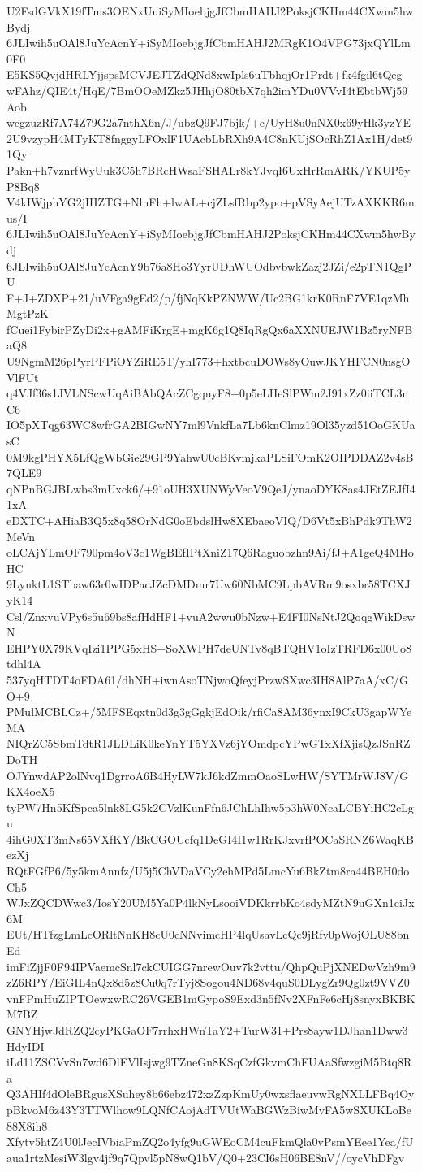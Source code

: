 U2FsdGVkX19fTms3OENxUuiSyMIoebjgJfCbmHAHJ2PoksjCKHm44CXwm5hwBydj
6JLIwih5uOAl8JuYcAcnY+iSyMIoebjgJfCbmHAHJ2MRgK1O4VPG73jxQYlLm0F0
E5KS5QvjdHRLYjjspsMCVJEJTZdQNd8xwIpls6uTbhqjOr1Prdt+fk4fgil6tQeg
wFAhz/QIE4t/HqE/7BmOOeMZkz5JHhjO80tbX7qh2imYDu0VVvI4tEbtbWj59Aob
wcgzuzRf7A74Z79G2a7nthX6n/J/ubzQ9FJ7bjk/+c/UyH8u0nNX0x69yHk3yzYE
2U9vzypH4MTyKT8fnggyLFOxlF1UAcbLbRXh9A4C8nKUjSOcRhZ1Ax1H/det91Qy
Pakn+h7vznrfWyUuk3C5h7BRcHWsaFSHALr8kYJvqI6UxHrRmARK/YKUP5yP8Bq8
V4kIWjphYG2jIHZTG+NlnFh+lwAL+cjZLsfRbp2ypo+pVSyAejUTzAXKKR6mus/I
6JLIwih5uOAl8JuYcAcnY+iSyMIoebjgJfCbmHAHJ2PoksjCKHm44CXwm5hwBydj
6JLIwih5uOAl8JuYcAcnY9b76a8Ho3YyrUDhWUOdbvbwkZazj2JZi/e2pTN1QgPU
F+J+ZDXP+21/uVFga9gEd2/p/fjNqKkPZNWW/Uc2BG1krK0RnF7VE1qzMhMgtPzK
fCuei1FybirPZyDi2x+gAMFiKrgE+mgK6g1Q8IqRgQx6aXXNUEJW1Bz5ryNFBaQ8
U9NgmM26pPyrPFPiOYZiRE5T/yhI773+hxtbcuDOWs8yOuwJKYHFCN0nsgOVlFUt
q4VJf36s1JVLNScwUqAiBAbQAcZCgquyF8+0p5eLHeSlPWm2J91xZz0iiTCL3nC6
IO5pXTqg63WC8wfrGA2BIGwNY7ml9VnkfLa7Lb6knClmz19Ol35yzd51OoGKUasC
0M9kgPHYX5LfQgWbGie29GP9YahwU0cBKvmjkaPLSiFOmK2OIPDDAZ2v4sB7QLE9
qNPnBGJBLwbs3mUxck6/+91oUH3XUNWyVeoV9QeJ/ynaoDYK8as4JEtZEJfI41xA
eDXTC+AHiaB3Q5x8q58OrNdG0oEbdslHw8XEbaeoVIQ/D6Vt5xBhPdk9ThW2MeVn
oLCAjYLmOF790pm4oV3c1WgBEfIPtXniZ17Q6Raguobzhn9Ai/fJ+A1geQ4MHoHC
9LynktL1STbaw63r0wIDPacJZcDMDmr7Uw60NbMC9LpbAVRm9osxbr58TCXJyK14
Csl/ZnxvuVPy6s5u69bs8afHdHF1+vuA2wwu0bNzw+E4FI0NsNtJ2QoqgWikDswN
EHPY0X79KVqIzi1PPG5xHS+SoXWPH7deUNTv8qBTQHV1oIzTRFD6x00Uo8tdhl4A
537yqHTDT4oFDA61/dhNH+iwnAsoTNjwoQfeyjPrzwSXwc3IH8AlP7aA/xC/GO+9
PMulMCBLCz+/5MFSEqxtn0d3g3gGgkjEdOik/rfiCa8AM36ynxI9CkU3gapWYeMA
NIQrZC5SbmTdtR1JLDLiK0keYnYT5YXVz6jYOmdpcYPwGTxXfXjisQzJSnRZDoTH
OJYnwdAP2olNvq1DgrroA6B4HyLW7kJ6kdZmmOaoSLwHW/SYTMrWJ8V/GKX4oeX5
tyPW7Hn5KfSpca5lnk8LG5k2CVzlKunFfn6JChLhIhw5p3hW0NcaLCBYiHC2cLgu
4ihG0XT3mNs65VXfKY/BkCGOUcfq1DeGI4I1w1RrKJxvrfPOCaSRNZ6WaqKBezXj
RQtFGfP6/5y5kmAnnfz/U5j5ChVDaVCy2ehMPd5LmcYu6BkZtm8ra44BEH0doCh5
WJxZQCDWwc3/IosY20UM5Ya0P4lkNyLsooiVDKkrrbKo4sdyMZtN9uGXn1ciJx6M
EUt/HTfzgLmLcORltNnKH8cU0cNNvimcHP4lqUsavLcQc9jRfv0pWojOLU88bnEd
imFiZjjF0F94IPVaemcSnl7ckCUIGG7nrewOuv7k2vttu/QhpQuPjXNEDwVzh9m9
zZ6RPY/EiGIL4nQx8d5z8Cu0q7rTyj8Sogou4ND68v4quS0DLygZr9Qg0zt9VVZ0
vnFPmHuZIPTOewxwRC26VGEB1mGypoS9Exd3n5fNv2XFnFe6cHj8snyxBKBKM7BZ
GNYHjwJdRZQ2cyPKGaOF7rrhxHWnTaY2+TurW31+Prs8ayw1DJhan1Dww3HdyIDI
iLd11ZSCVvSn7wd6DlEVlIsjwg9TZneGn8KSqCzfGkvmChFUAaSfwzgiM5Btq8Ra
Q3AHIf4dOleBRgusXSuhey8b66ebz472xzZzpKmUy0wxsflaeuvwRgNXLLFBq4Oy
pBkvoM6z43Y3TTWlhow9LQNfCAojAdTVUtWaBGWzBiwMvFA5wSXUKLoBe88X8ih8
Xfytv5htZ4U0lJecIVbiaPmZQ2o4yfg9uGWEoCM4cuFkmQla0vPsmYEee1Yea/fU
aua1rtzMesiW3lgv4jf9q7Qpvl5pN8wQ1bV/Q0+23CI6sH06BE8nV//oycVhDFgv
